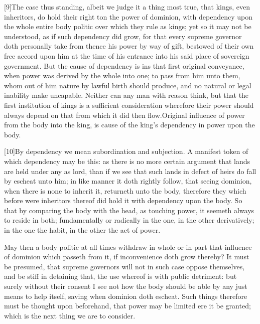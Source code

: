 [9]The case thus standing, albeit we judge it a thing most true, that kings, even inheritors, do hold their right ton the power of dominion, with dependency upon the whole entire body politic over which they rule as kings; yet so it may not be understood, as if such dependency did grow, for that every supreme governor doth personally take from thence his power by way of gift, bestowed of their own free accord upon him at the time of his entrance into his said place of sovereign government. But the cause of dependency is ins that first original conveyance, when power was derived by the whole into one; to pass from him unto them, whom out of him nature by lawful birth should produce, and no natural or legal inability make uncapable. Neither can any man with reason think, but that the first institution of kings is a sufficient consideration wherefore their power should always depend on that from which it did then flow.Original influence of power from the body into the king, is cause of the king’s dependency in power upon the body.


[10]By dependency we mean subordination and subjection. A manifest token of which dependency may be this: as there is no more certain argument that lands are held under any as lord, than if we see that such lands in defect of heirs do fall by escheat unto him; in like manner it doth rightly follow, that seeing dominion, when there is none to inherit it, returneth unto the body, therefore they which before were inheritors thereof did hold it with dependency upon the body. So that by comparing the body with the head, as touching power, it seemeth always to reside in both; fundamentally or radically in the one, in the other derivatively; in the one the habit, in the other the act of power.

May then a body politic at all times withdraw in whole or in part that influence of dominion which passeth from it, if inconvenience doth grow thereby? It must be presumed, that supreme governors will not in such case oppose themselves, and be stiff in detaining that, the use whereof is with public detriment: but surely without their consent I see not how the body should be able by any just means to help itself, saving when dominion doth escheat. Such things therefore must be thought upon beforehand, that power may be limited ere it be granted; which is the next thing we are to consider.

